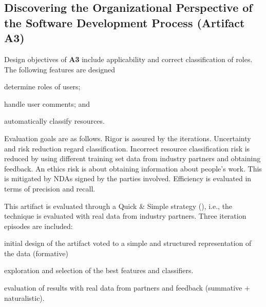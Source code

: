\subsection{Discovering the Organizational Perspective of the Software Development Process (Artifact A3)}
Design objectives of \textbf{A3} include applicability and correct classification of roles. The following features are designed 
\begin{iiilist}
	\item determine roles of users;
	\item handle user comments; and
	\item automatically classify resources.
\end{iiilist}
Evaluation goals are as follows. Rigor is assured by the iterations. Uncertainty and risk reduction regard classification. Incorrect resource classification risk is reduced by using different training set data from industry partners and obtaining feedback. An ethics risk is about obtaining information about people's work. This is mitigated by NDAs signed by the parties involved. Efficiency is evaluated in terms of precision and recall. 

This artifact is evaluated through a Quick \& Simple strategy (\cite{Venable2016}), i.e., the technique is evaluated with real data from industry partners. Three iteration episodes are included: 
\begin{iiilist}
	\item initial design of the artifact voted to a simple and structured representation of the data (formative)
	\item exploration and selection of the best features and classifiers.
	\item evaluation of results with real data from partners and feedback (summative + naturalistic).
\end{iiilist}

